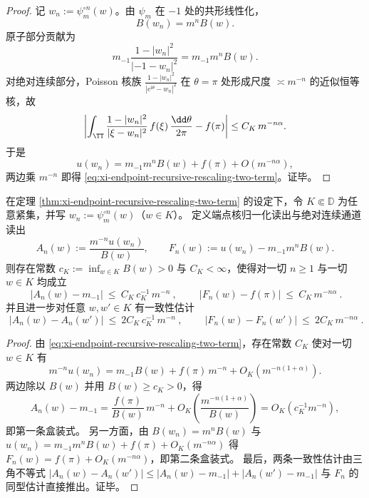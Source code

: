 \begin{proof}
记 \(w_n:=\psi_m^{\circ n}(w)\)。由 \(\psi_m\) 在 \(-1\) 处的共形线性化，
\[
B(w_n)=m^nB(w).
\]
原子部分贡献为
\[
m_{-1}\frac{1-|w_n|^2}{|-1-w_n|^2}=m_{-1}m^nB(w).
\]
对绝对连续部分，Poisson 核族
\(
\frac{1-|w_n|^2}{|e^{\mathrm{i}\theta}-w_n|^2}
\)
在 \(\theta=\pi\) 处形成尺度 \(\asymp m^{-n}\) 的近似恒等核，故
\[
\left|
\int_{\TT}\frac{1-|w_n|^2}{|\xi-w_n|^2}\,f(\xi)\,\frac{\dd\theta}{2\pi}
-f(\pi)\right|
\le C_K\,m^{-n\alpha}.
\]
于是
\[
u(w_n)=m_{-1}m^nB(w)+f(\pi)+O(m^{-n\alpha}),
\]
两边乘 \(m^{-n}\) 即得 \eqref{eq:xi-endpoint-recursive-rescaling-two-term}。证毕。
\end{proof}

\begin{theorem}[端点双通道重整化的可辨识极限与显式误差]\label{thm:xi-endpoint-two-channel-renormalization-identifiability}
在定理 \ref{thm:xi-endpoint-recursive-rescaling-two-term} 的设定下，令 \(K\Subset\mathbb{D}\) 为任意紧集，并写
\(
w_n:=\psi_m^{\circ n}(w)
\)（\(w\in K\)）。
定义端点核归一化读出与绝对连续通道读出
\[
A_n(w):=\frac{m^{-n}u(w_n)}{B(w)},
\qquad
F_n(w):=u(w_n)-m_{-1}m^nB(w).
\]
则存在常数
\(
c_K:=\inf_{w\in K}B(w)>0
\)
与 \(C_K<\infty\)，使得对一切 \(n\ge 1\) 与一切 \(w\in K\) 均成立
\[
\boxed{\ \bigl|A_n(w)-m_{-1}\bigr|\ \le\ C_K\,c_K^{-1}\,m^{-n}\ },
\qquad
\boxed{\ \bigl|F_n(w)-f(\pi)\bigr|\ \le\ C_K\,m^{-n\alpha}\ }.
\]
并且进一步对任意 \(w,w'\in K\) 有一致性估计
\[
\boxed{\ \bigl|A_n(w)-A_n(w')\bigr|\ \le\ 2C_K\,c_K^{-1}\,m^{-n}\ },
\qquad
\boxed{\ \bigl|F_n(w)-F_n(w')\bigr|\ \le\ 2C_K\,m^{-n\alpha}\ }.
\]
\end{theorem}
\begin{proof}
由 \eqref{eq:xi-endpoint-recursive-rescaling-two-term}，存在常数 \(C_K\) 使对一切 \(w\in K\) 有
\[
m^{-n}u(w_n)=m_{-1}B(w)+f(\pi)\,m^{-n}+O_K\!\left(m^{-n(1+\alpha)}\right).
\]
两边除以 \(B(w)\) 并用 \(B(w)\ge c_K>0\)，得
\[
A_n(w)-m_{-1}=\frac{f(\pi)}{B(w)}\,m^{-n}+O_K\!\left(\frac{m^{-n(1+\alpha)}}{B(w)}\right)
=O_K\!\left(c_K^{-1}m^{-n}\right),
\]
即第一条盒装式。
另一方面，由 \(B(w_n)=m^nB(w)\) 与 \(u(w_n)=m_{-1}m^nB(w)+f(\pi)+O_K(m^{-n\alpha})\) 得
\(
F_n(w)=f(\pi)+O_K(m^{-n\alpha})
\)，即第二条盒装式。
最后，两条一致性估计由三角不等式
\(
|A_n(w)-A_n(w')|\le |A_n(w)-m_{-1}|+|A_n(w')-m_{-1}|
\)
与 \(F_n\) 的同型估计直接推出。证毕。
\end{proof}

